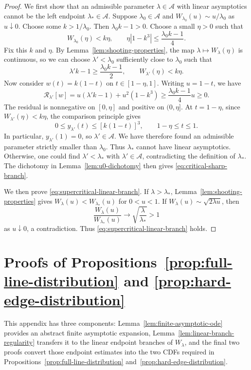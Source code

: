 \documentclass[12pt]{amsart}
\numberwithin{equation}{section}
\theoremstyle{plain}
\theoremstyle{definition}
\begin{document}
\begin{proof}
We first show that an admissible parameter $\lambda\in\mathcal A$ with
linear asymptotics cannot be the left endpoint $\lambda_*\in\mathcal A$.
Suppose $\lambda_0\in\mathcal A$ and
\(W_{\lambda_0}(u)\sim u/\lambda_0\) as \(u\downarrow 0\).
Choose some \(k>1/\lambda_0\). Then
\(\lambda_0k-1>0\). Choose a small \(\eta>0\) such that
\[
 W_{\lambda_0}(\eta)<k\eta,
 \qquad
 \eta|1-k^3|\le\frac{\lambda_0k-1}{4}.
\]
Fix this \(k\) and \(\eta\). By Lemma~\ref{lem:shooting-properties}, the map
\(\lambda\mapsto W_\lambda(\eta)\) is continuous, so we can choose \(\lambda'<\lambda_0\) sufficiently close
to \(\lambda_0\) such that
\[
 \lambda'k-1\ge\frac{\lambda_0k-1}{2},
 \qquad
 W_{\lambda'}(\eta)<k\eta.
\]
Now consider $w(t)=k(1-t)$ on $t\in[1-\eta,1]$.  Writing
$u=1-t$, we have
\[
 \mathcal R_{\lambda'}[w]
 =u(\lambda'k-1)+u^2(1-k^3)
 \ge\frac{\lambda_0k-1}{4}u\ge0.
\]
The residual is nonnegative on $[0,\eta]$ and positive on $(0,\eta]$.
At \(t=1-\eta\), since \(W_{\lambda'}(\eta)<k\eta\), the comparison principle gives
\[
 0\le y_{\lambda'}(t)\le[k(1-t)]^3,
 \qquad 1-\eta\le t\le1.
\]
In particular, \(y_{\lambda'}(1)=0\), so \(\lambda'\in\mathcal A\).  We have
therefore found an admissible parameter strictly smaller than \(\lambda_0\).
Thus $\lambda_*$ cannot have linear asymptotics.  Otherwise, one could
find $\lambda'<\lambda_*$ with $\lambda'\in\mathcal A$, contradicting
the definition of $\lambda_*$.  The dichotomy in
Lemma~\ref{lem:u0-dichotomy} then gives
\eqref{eq:critical-sharp-branch}.

We then prove \eqref{eq:supercritical-linear-branch}.
If \(\lambda>\lambda_*\), Lemma~\ref{lem:shooting-properties} gives
$W_\lambda(u)<W_{\lambda_*}(u)$ for $0<u<1$.  If
$W_\lambda(u)\sim\sqrt{2\lambda u}$, then
\[
 \frac{W_\lambda(u)}{W_{\lambda_*}(u)}\longrightarrow
 \sqrt{\frac \lambda{\lambda_*}}>1
\]
as \(u\downarrow0\), a contradiction.  Thus
\eqref{eq:supercritical-linear-branch} holds.
\end{proof}

\section{Proofs of Propositions~\ref{prop:full-line-distribution} and \ref{prop:hard-edge-distribution} }
\label{app:regularity}

This appendix has three components: Lemma~\ref{lem:finite-asymptotic-ode}
provides an abstract finite asymptotic expansion,
Lemma~\ref{lem:linear-branch-regularity} transfers it to the linear endpoint
branches of $W_\lambda$, and the final two proofs convert those endpoint
estimates into the two CDFs required in
Propositions~\ref{prop:full-line-distribution}
and~\ref{prop:hard-edge-distribution}.
\end{document}

